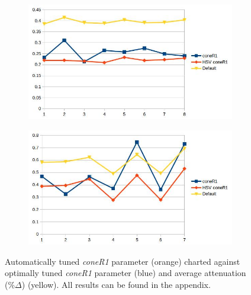 \documentclass[12pt]{report}
\begin{document}
\begin{figure}
  \centering
  \begin{subfigure}{1\linewidth}
  \includegraphics[width=1\linewidth]{figures/model/highway1_calc_coneR1.jpg}
  \caption{}
\end{subfigure}
\hfill
\begin{subfigure}{1\linewidth}
  \includegraphics[width=1\linewidth]{figures/model/highway3_calc_coneR1.jpg}
  \caption{}
\end{subfigure}

\caption{Automatically tuned \textit{coneR1} parameter (orange) charted against optimally tuned \textit{coneR1} parameter (blue) and average attenuation (\%$\Delta$) (yellow). All results can be found in the appendix.}
\label{fig:new_coneR1}
\end{figure}
\end{document}
